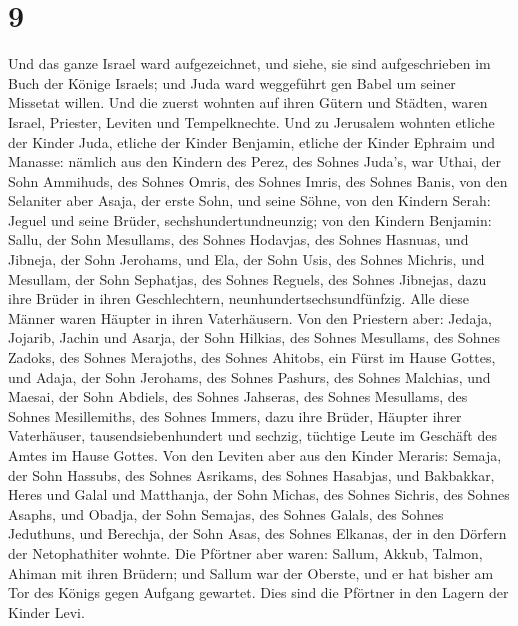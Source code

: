 \hypertarget{section-8}{%
\section{9}\label{section-8}}

 Und das ganze Israel ward aufgezeichnet, und siehe, sie
sind aufgeschrieben im Buch der Könige Israels; und Juda ward weggeführt
gen Babel um seiner Missetat willen.  Und die zuerst wohnten
auf ihren Gütern und Städten, waren Israel, Priester, Leviten und
Tempelknechte.  Und zu Jerusalem wohnten etliche der Kinder
Juda, etliche der Kinder Benjamin, etliche der Kinder Ephraim und
Manasse:  nämlich aus den Kindern des Perez, des Sohnes
Juda's, war Uthai, der Sohn Ammihuds, des Sohnes Omris, des Sohnes
Imris, des Sohnes Banis,  von den Selaniter aber Asaja, der
erste Sohn, und seine Söhne,  von den Kindern Serah: Jeguel
und seine Brüder, sechshundertundneunzig;  von den Kindern
Benjamin: Sallu, der Sohn Mesullams, des Sohnes Hodavjas, des Sohnes
Hasnuas,  und Jibneja, der Sohn Jerohams, und Ela, der Sohn
Usis, des Sohnes Michris, und Mesullam, der Sohn Sephatjas, des Sohnes
Reguels, des Sohnes Jibnejas,  dazu ihre Brüder in ihren
Geschlechtern, neunhundertsechsundfünfzig. Alle diese Männer waren
Häupter in ihren Vaterhäusern.  Von den Priestern aber:
Jedaja, Jojarib, Jachin  und Asarja, der Sohn Hilkias, des
Sohnes Mesullams, des Sohnes Zadoks, des Sohnes Merajoths, des Sohnes
Ahitobs, ein Fürst im Hause Gottes,  und Adaja, der Sohn
Jerohams, des Sohnes Pashurs, des Sohnes Malchias, und Maesai, der Sohn
Abdiels, des Sohnes Jahseras, des Sohnes Mesullams, des Sohnes
Mesillemiths, des Sohnes Immers,  dazu ihre Brüder, Häupter
ihrer Vaterhäuser, tausendsiebenhundert und sechzig, tüchtige Leute im
Geschäft des Amtes im Hause Gottes.  Von den Leviten aber
aus den Kinder Meraris: Semaja, der Sohn Hassubs, des Sohnes Asrikams,
des Sohnes Hasabjas,  und Bakbakkar, Heres und Galal und
Matthanja, der Sohn Michas, des Sohnes Sichris, des Sohnes Asaphs,
 und Obadja, der Sohn Semajas, des Sohnes Galals, des
Sohnes Jeduthuns, und Berechja, der Sohn Asas, des Sohnes Elkanas, der
in den Dörfern der Netophathiter wohnte.  Die Pförtner aber
waren: Sallum, Akkub, Talmon, Ahiman mit ihren Brüdern; und Sallum war
der Oberste,  und er hat bisher am Tor des Königs gegen
Aufgang gewartet. Dies sind die Pförtner in den Lagern der Kinder Levi.
